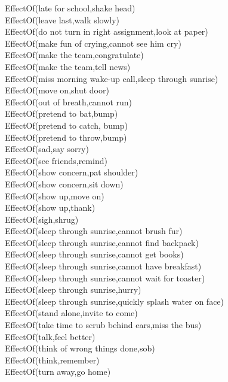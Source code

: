 \begin{multicols}{2}
\begin{footnotesize}
EffectOf(late for school,shake head) \\
EffectOf(leave last,walk slowly) \\
EffectOf(do not turn in right assignment,look at paper) \\
EffectOf(make fun of crying,cannot see him cry) \\
EffectOf(make the team,congratulate) \\
EffectOf(make the team,tell news) \\
EffectOf(miss morning wake-up call,sleep through sunrise) \\
EffectOf(move on,shut door) \\
EffectOf(out of breath,cannot run) \\
EffectOf(pretend to bat,bump) \\
EffectOf(pretend to catch, bump) \\
EffectOf(pretend to throw,bump) \\
EffectOf(sad,say sorry) \\
EffectOf(see friends,remind) \\
EffectOf(show concern,pat shoulder) \\
EffectOf(show concern,sit down) \\
EffectOf(show up,move on) \\
EffectOf(show up,thank) \\
EffectOf(sigh,shrug) \\
EffectOf(sleep through sunrise,cannot brush fur) \\
EffectOf(sleep through sunrise,cannot find backpack) \\
EffectOf(sleep through sunrise,cannot get books) \\
EffectOf(sleep through sunrise,cannot have breakfast) \\
EffectOf(sleep through sunrise,cannot wait for toaster) \\
EffectOf(sleep through sunrise,hurry) \\
EffectOf(sleep through sunrise,quickly splash water on face) \\
EffectOf(stand alone,invite to come) \\
EffectOf(take time to scrub behind ears,miss the bus) \\
EffectOf(talk,feel better) \\
EffectOf(think of wrong things done,sob) \\
EffectOf(think,remember) \\
EffectOf(turn away,go home) \\

\end{footnotesize}
\end{multicols}
